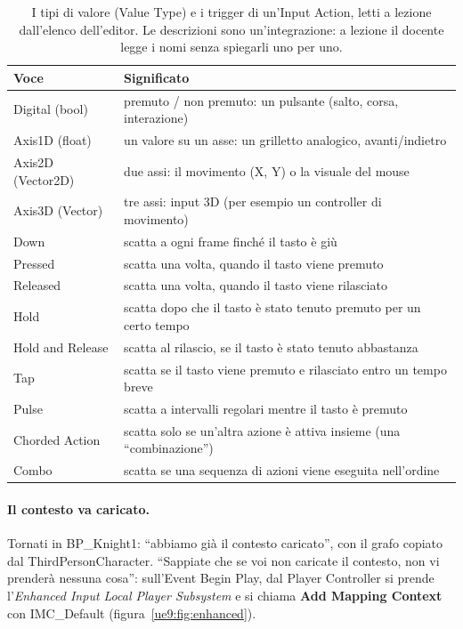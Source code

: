 \begin{table}[htbp]
\centering
\small
\begin{tabular}{@{}p{3.2cm}p{10.8cm}@{}}
\toprule
\textbf{Voce} & \textbf{Significato} \\
\midrule
Digital (bool) & premuto / non premuto: un pulsante (salto, corsa, interazione) \\
Axis1D (float) & un valore su un asse: un grilletto analogico, avanti/indietro \\
Axis2D (Vector2D) & due assi: il movimento (X, Y) o la visuale del mouse \\
Axis3D (Vector) & tre assi: input 3D (per esempio un controller di movimento) \\
\midrule
Down & scatta a ogni frame finché il tasto è giù \\
Pressed & scatta una volta, quando il tasto viene premuto \\
Released & scatta una volta, quando il tasto viene rilasciato \\
Hold & scatta dopo che il tasto è stato tenuto premuto per un certo tempo \\
Hold and Release & scatta al rilascio, se il tasto è stato tenuto abbastanza \\
Tap & scatta se il tasto viene premuto e rilasciato entro un tempo breve \\
Pulse & scatta a intervalli regolari mentre il tasto è premuto \\
Chorded Action & scatta solo se un'altra azione è attiva insieme (una ``combinazione'') \\
Combo & scatta se una sequenza di azioni viene eseguita nell'ordine \\
\bottomrule
\end{tabular}
\caption{I tipi di valore (Value Type) e i trigger di un'Input Action, letti a lezione
dall'elenco dell'editor. Le descrizioni sono un'integrazione: a lezione il docente
legge i nomi senza spiegarli uno per uno.}
\label{ue9:tab:inputaction}
\end{table}

\paragraph{Il contesto va caricato.} Tornati in BP\_Knight1: ``abbiamo già il contesto
caricato'', con il grafo copiato dal ThirdPersonCharacter. ``Sappiate che se voi non
caricate il contesto, non vi prenderà nessuna cosa'': sull'Event Begin Play, dal Player
Controller si prende l'\emph{Enhanced Input Local Player Subsystem} e si chiama
\textbf{Add Mapping Context} con IMC\_Default (figura~\ref{ue9:fig:enhanced}).

